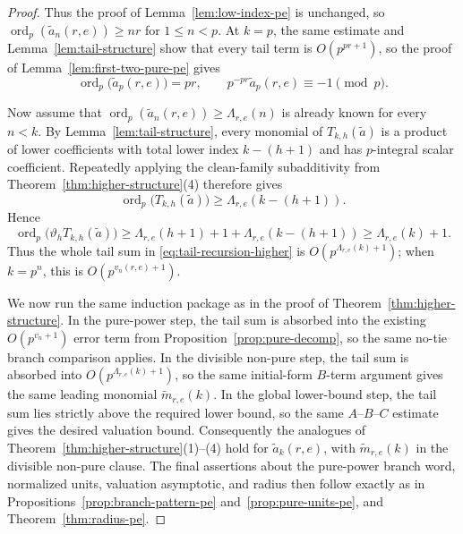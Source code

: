 \documentclass[11pt]{amsart}
\numberwithin{equation}{section}
\DeclareMathOperator{\ordop}{ord}
\newcommand{\vp}{\ordop_p}
\begin{document}
\begin{proof}
Thus the proof of Lemma~\ref{lem:low-index-pe} is unchanged, so $\vp(\widetilde a_n(r,e))\ge nr$ for $1\le n<p$.  At $k=p$, the same estimate and Lemma~\ref{lem:tail-structure} show that every tail term is $O(p^{pr+1})$, so the proof of Lemma~\ref{lem:first-two-pure-pe} gives
\[
        \vp\bigl(\widetilde a_p(r,e)\bigr)=pr,
        \qquad
        p^{-pr}\widetilde a_p(r,e)\equiv-1\pmod p.
\]

Now assume that $\vp(\widetilde a_n(r,e))\ge \Lambda_{r,e}(n)$ is already known for every $n<k$.  By Lemma~\ref{lem:tail-structure}, every monomial of $T_{k,h}(\widetilde a)$ is a product of lower coefficients with total lower index $k-(h+1)$ and has $p$-integral scalar coefficient.  Repeatedly applying the clean-family subadditivity from Theorem~\ref{thm:higher-structure}\textup{(4)} therefore gives
\[
        \vp\bigl(T_{k,h}(\widetilde a)\bigr)\ge \Lambda_{r,e}(k-(h+1)).
\]
Hence
\[
        \vp\bigl(\vartheta_hT_{k,h}(\widetilde a)\bigr)
        \ge \Lambda_{r,e}(h+1)+1+\Lambda_{r,e}(k-(h+1))
        \ge \Lambda_{r,e}(k)+1.
\]
Thus the whole tail sum in \eqref{eq:tail-recursion-higher} is $O(p^{\Lambda_{r,e}(k)+1})$; when $k=p^n$, this is $O(p^{v_n(r,e)+1})$.

We now run the same induction package as in the proof of Theorem~\ref{thm:higher-structure}.  In the pure-power step, the tail sum is absorbed into the existing $O(p^{v_n+1})$ error term from Proposition~\ref{prop:pure-decomp}, so the same no-tie branch comparison applies.  In the divisible non-pure step, the tail sum is absorbed into $O(p^{\Lambda_{r,e}(k)+1})$, so the same initial-form $B$-term argument gives the same leading monomial $\widetilde m_{r,e}(k)$.  In the global lower-bound step, the tail sum lies strictly above the required lower bound, so the same $A$--$B$--$C$ estimate gives the desired valuation bound.  Consequently the analogues of Theorem~\ref{thm:higher-structure}\textup{(1)}--\textup{(4)} hold for $\widetilde a_k(r,e)$, with $\widetilde m_{r,e}(k)$ in the divisible non-pure clause.  The final assertions about the pure-power branch word, normalized units, valuation asymptotic, and radius then follow exactly as in Propositions~\ref{prop:branch-pattern-pe} and~\ref{prop:pure-units-pe}, and Theorem~\ref{thm:radius-pe}.
\end{proof}
\end{document}

